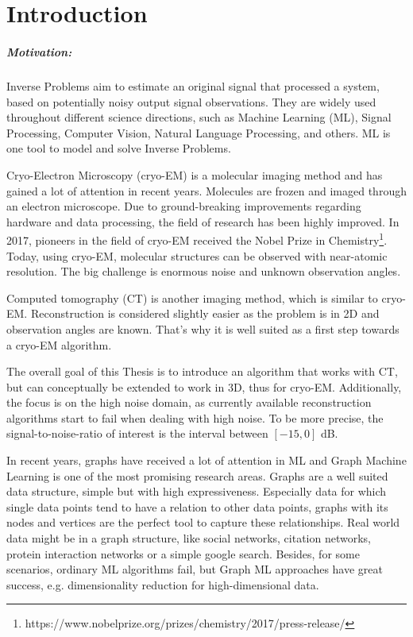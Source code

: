 \chapter{Introduction}
\label{sec:introduction}

\paragraph{Motivation:}
Inverse Problems aim to estimate an original signal that processed a system, 
based on potentially noisy output signal observations.
They are widely used throughout different science directions, such as Machine Learning (ML),
Signal Processing, Computer Vision, Natural Language Processing, and others.
ML is one tool to model and solve Inverse Problems.

Cryo-Electron Microscopy (cryo-EM) is a molecular imaging method and has gained a lot of attention in recent years. 
Molecules are frozen and imaged through an electron microscope.
Due to ground-breaking improvements regarding hardware and data processing, the field of research
has been highly improved. In 2017, pioneers in the field of cryo-EM received the 
Nobel Prize in Chemistry\footnote{https://www.nobelprize.org/prizes/chemistry/2017/press-release/}.
Today, using cryo-EM, molecular structures can be observed with near-atomic resolution.
The big challenge is enormous noise and unknown observation angles.

Computed tomography (CT) is another imaging method, which is similar to cryo-EM. 
Reconstruction is considered slightly easier as the problem is in 2D and observation angles are known.
That's why it is well suited as a first step towards a cryo-EM algorithm.

The overall goal of this Thesis is to introduce an algorithm that works with CT, but 
can conceptually be extended to work in 3D, thus for cryo-EM. 
Additionally, the focus is on the high noise domain, as currently available reconstruction algorithms
start to fail when dealing with high noise. To be more precise, the signal-to-noise-ratio of interest is the interval 
 between $[-15, 0]$ dB.


In recent years, graphs have received a lot of attention in ML and Graph Machine Learning is one of the most promising research areas.
Graphs are a well suited data structure, simple but with high expressiveness. 
Especially data for which single data points tend to have a relation to other data points, graphs with its nodes and vertices are the perfect tool
to capture these relationships. 
Real world data might be in a graph structure, like social networks, citation networks,
protein interaction networks or a simple google search. 
Besides, for some scenarios, ordinary ML algorithms fail, but Graph ML approaches have great success, e.g. dimensionality reduction for high-dimensional data.




